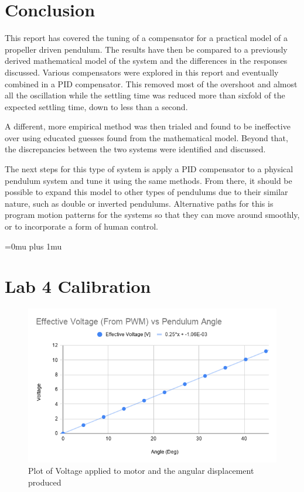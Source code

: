 \documentclass[a4paper, 11pt, compsoc]{IEEEtran}
\begin{document}
    \section{Conclusion}\label{sec:conc}
		This report has covered the tuning of a compensator for a practical model of a propeller driven pendulum. The results have then be compared to a previously derived mathematical model of the system and the differences in the responses discussed. Various compensators were explored in this report and eventually combined in a PID compensator. This removed most of the overshoot and almost all the oscillation while the settling time was reduced more than sixfold of the expected settling time, down to less than a second.
		\par
		A different, more empirical method was then trialed and found to be ineffective over using educated guesses found from the mathematical model. Beyond that, the discrepancies between the two systems were identified and discussed. 
		\par
		The next steps for this type of system is apply a PID compensator to a physical pendulum system and tune it using the same methods. From there, it should be possible to expand this model to other types of pendulums due to their similar nature, such as double or inverted pendulums. Alternative paths for this is program motion patterns for the systems so that they can move around smoothly, or to incorporate a form of human control.


    \Urlmuskip=0mu plus 1mu\relax
    
    

    \onecolumn
	\appendices
		\section{Lab 4 Calibration} \label{app:calibration}
			\begin{figure}[!ht]
				\centering
				\includegraphics[width=0.8\columnwidth]{angleVoltage.png}
				\caption{Plot of Voltage applied to motor and the angular displacement produced}
				\label{fig:voltAngle}
			\end{figure}
\end{document}
